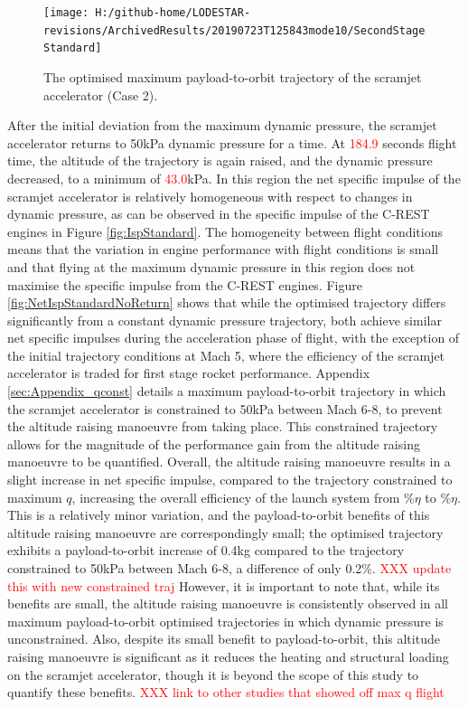 \begin{figure}[ht!]%
\centering
\texttt{[image: H:/github-home/LODESTAR-revisions/ArchivedResults/20190723T125843mode10/SecondStageStandard]}
\caption{The optimised maximum payload-to-orbit trajectory of the scramjet accelerator (Case 2).}
\label{fig:SecondStageStandardNoReturn}
\end{figure}



After the initial deviation from the maximum dynamic pressure, the scramjet accelerator returns to 50kPa dynamic pressure for a time. 
At \textcolor{red}{184.9} seconds flight time, the altitude of the trajectory is again raised, and the dynamic pressure decreased, to a minimum of \textcolor{red}{43.0}kPa. In this region the net specific impulse of the scramjet accelerator is relatively homogeneous with respect to changes in dynamic pressure, as can be observed in the specific impulse of the C-REST engines in Figure \ref{fig:IspStandard}. The homogeneity between flight conditions means that the variation in engine performance with flight conditions is small and that flying at the maximum dynamic pressure in this region does not maximise the specific impulse from the C-REST engines. Figure \ref{fig:NetIspStandardNoReturn} shows that while the optimised trajectory differs significantly from a constant dynamic pressure trajectory, both achieve similar net specific impulses during the acceleration phase of flight, with the exception of the initial trajectory conditions at Mach 5, where the efficiency of the scramjet accelerator is traded for first stage rocket performance. 
Appendix \ref{sec:Appendix_qconst} details a maximum payload-to-orbit trajectory in which the scramjet accelerator is constrained to 50kPa between Mach 6-8, to prevent the altitude raising manoeuvre from taking place. This constrained trajectory allows for the magnitude of the performance gain from the altitude raising manoeuvre to be quantified. 
Overall, the altitude raising manoeuvre results in a slight increase in net specific impulse, compared to the trajectory constrained to maximum $q$, increasing the overall efficiency of the launch system from \totalExergyEffqconstrainedNoReturn \%$\eta$ to \totalExergyEffStandardNoReturn\%$\eta$. This is a relatively minor variation, and the payload-to-orbit benefits of this altitude raising manoeuvre are correspondingly small; 
the optimised trajectory exhibits a payload-to-orbit increase of 0.4kg compared to the trajectory constrained to 50kPa between Mach 6-8, a difference of only 0.2\%. \textcolor{red}{XXX update this with new constrained traj}
However, it is important to note that, while its benefits are small, the altitude raising manoeuvre is consistently observed in all maximum payload-to-orbit optimised trajectories in which dynamic pressure is unconstrained. 
Also, despite its small benefit to payload-to-orbit, this altitude raising manoeuvre is significant as it reduces the heating and structural loading on the scramjet accelerator, though it is beyond the scope of this study to quantify these benefits. 
\textcolor{red}{XXX link to other studies that showed off max q flight}



